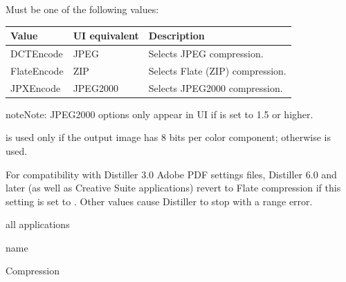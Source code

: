 \documentclass[letterpaper,12pt,english,openany,oneside]{sphinxmanual}
\begin{document}
Must be one of the following values:


\begin{savenotes}\sphinxattablestart
\centering
{}\label{\detokenize{PDF_Create_CommonSettings:section-5}}\nobreak
\begin{tabulary}{\linewidth}[t]{|T|T|T|}
\hline
\sphinxstyletheadfamily 
Value
&\sphinxstyletheadfamily 
UI equivalent
&\sphinxstyletheadfamily 
Description
\\
\hline
DCTEncode
&
JPEG
&
Selects JPEG compression.
\\
\hline
FlateEncode
&
ZIP
&
Selects Flate (ZIP) compression.
\\
\hline
JPXEncode
&
JPEG2000
&
Selects JPEG2000 compression.
\\
\hline
\end{tabulary}
\par
\sphinxattableend\end{savenotes}

\begin{sphinxadmonition}{note}{Note:}
JPEG2000 options only appear in UI if  is set to 1.5 or higher.
\end{sphinxadmonition}

 is used only if the output image has 8 bits per color component; otherwise  is used.

For compatibility with Distiller 3.0 Adobe PDF settings files, Distiller 6.0 and later (as well as Creative Suite applications) revert to Flate compression if this setting is set to  . Other values cause Distiller to stop with a range error.

\label{\detokenize{PDF_Create_CommonSettings:supported-by-25}}

all applications

\label{\detokenize{PDF_Create_CommonSettings:type-25}}

name

\label{\detokenize{PDF_Create_CommonSettings:ui-name-19}}

Compression

\label{\detokenize{PDF_Create_CommonSettings:default-value-22}}

\begin{sphinxVerbatim}[commandchars=\\\{\}]
\end{sphinxVerbatim}
\end{document}
